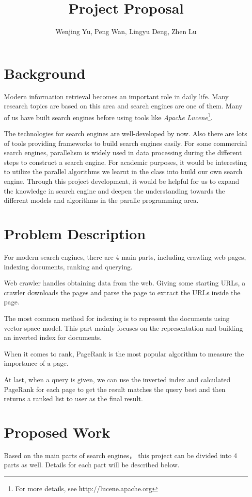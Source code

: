\documentclass[11pt]{amsart}
\title{Project Proposal}
\author{Wenjing Yu, Peng Wan, Lingyu Deng, Zhen Lu}
\begin{document}
\maketitle
\section{Background}
Modern information retrieval becomes an important role in daily life. Many research topics
are based on this area and search engines are one of them. Many of us have built search engines 
before using tools like \emph{Apache Lucene}\footnote{For more details, see 
http://lucene.apache.org}. 

The technologies for search engines are well-developed by now. Also there are lots of tools providing frameworks to build search engines easily. 
For some commercial search engines, parallelism is widely used in data processing during the different steps to 
construct a search engine. For academic purposes, it would be interesting to utilize the parallel algorithms we learnt in the class
into build our own search engine. Through this project development, it would be helpful for us to expand the knowledge in 
search engine and deepen the understanding towards the different models and algorithms in the paralle programming area.

\section{Problem Description}
For modern search engines, there are 4 main parts, including crawling web pages, indexing documents, 
ranking and querying. 

Web crawler handles obtaining data from the web. Giving some starting URLs, a crawler downloads the
pages and parse the page to extract the URLs inside the page. 

The most common method for indexing is to represent the documents using vector space model. This part
mainly focuses on the representation and building an inverted index for documents.

When it comes to rank, PageRank is the most popular algorithm to measure the importance of a page. 

At last, when a query is given, we can use the inverted index and calculated PageRank for each page
to get the result matches the query best and then returns a ranked list to user as the final result.

\section{Proposed Work}
Based on the main parts of search engines， this project can be divided into 4 parts as well. Details
for each part will be described below.
\end{document}
